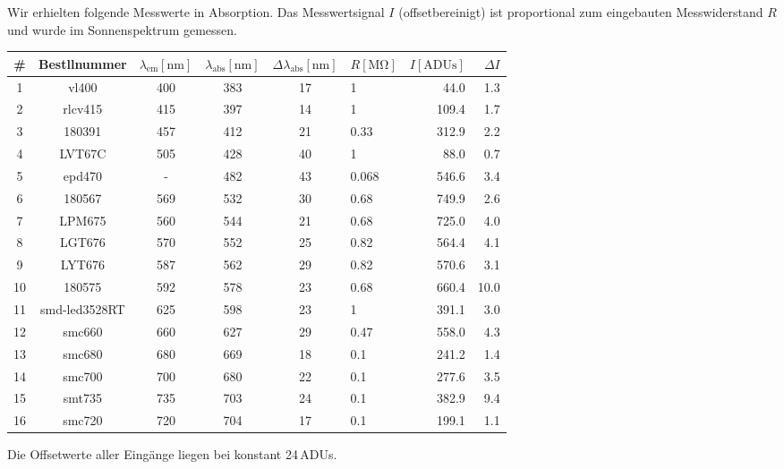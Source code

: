 \documentclass[a4paper, 12pt]{scrartcl}
\begin{document}
Wir erhielten folgende Messwerte in Absorption.
Das Messwertsignal $I$ (offsetbereinigt) ist proportional zum eingebauten Messwiderstand $R$ und wurde im Sonnenspektrum gemessen.

{\centering
\begin{tabular}{c|c|c|c|c|l|r|r}
\# &
Bestllnummer &
$\lambda_\text{em} [\mathrm{nm}]$ &
$\lambda_\text{abs} [\mathrm{nm}]$ &
$\Delta\lambda_\text{abs} [\mathrm{nm}]$ &
$R [\mathrm{M\Omega}]$ &
$I [\text{ADUs}]$ &
$\Delta I$\\
\hline
1 & vl400 & 400 & 383 & 17 & 1 & 44.0 & 1.3\\
2 & rlcv415 & 415 & 397 & 14 & 1 & 109.4 & 1.7\\
3 & 180391 & 457 & 412 & 21 & 0.33 & 312.9 & 2.2\\
4 & LVT67C & 505 & 428 & 40 & 1 & 88.0 & 0.7\\
5 & epd470 & - & 482 & 43 & 0.068 & 546.6 & 3.4\\
6 & 180567 & 569 & 532 & 30 & 0.68 & 749.9 & 2.6\\
7 & LPM675 & 560 & 544 & 21 & 0.68 & 725.0 & 4.0\\
8 & LGT676 & 570 & 552 & 25 & 0.82 & 564.4 & 4.1\\
9 & LYT676 & 587 & 562 & 29 & 0.82 & 570.6 & 3.1\\
10 & 180575 & 592 & 578 & 23 & 0.68 & 660.4 & 10.0\\
11 & smd-led3528RT & 625 & 598 & 23 & 1 & 391.1 & 3.0\\
12 & smc660 & 660 & 627 & 29 & 0.47 & 558.0 & 4.3\\
13 & smc680 & 680 & 669 & 18 & 0.1 & 241.2 & 1.4\\
14 & smc700 & 700 & 680 & 22 & 0.1 & 277.6 & 3.5\\
15 & smt735 & 735 & 703 & 24 & 0.1 & 382.9 & 9.4\\
16 & smc720 & 720 & 704 & 17 & 0.1 & 199.1 & 1.1\\
\end{tabular}}

Die Offsetwerte aller Eingänge liegen bei konstant 24\,ADUs.
\end{document}
